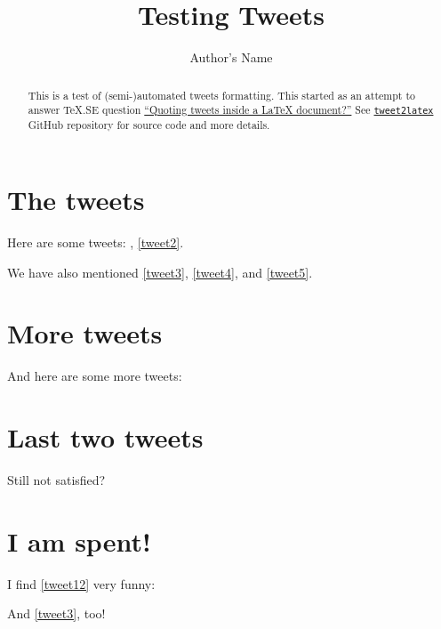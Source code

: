 \documentclass[a4paper,twocolumn]{article}
\newcommand{\inputTweet}[1]{%
  \def\tweetLabel{#1}%
}
\begin{document}
\title{Testing Tweets}
\author{Author's Name}

\maketitle

\begin{abstract}
  This is a test of (semi-)automated tweets formatting. This started as an
  attempt to answer \TeX .SE question
  \href{http://tex.stackexchange.com/q/323562/28495}{``Quoting tweets inside
    a \LaTeX{} document?''} See
  \texttt{\href{https://github.com/wilx/tweet2latex}{tweet2latex}} GitHub
  repository for source code and more details.
\end{abstract}

\section{The tweets}\label{the-tweets}%
Here are some tweets: , \cref{tweet2}.
\inputTweet{tweet1}

\inputTweet{tweet2}

\inputTweet{tweet3}

\inputTweet{tweet4}

\inputTweet{tweet5}

We have also mentioned \cref{tweet3}, \cref{tweet4}, and \cref{tweet5}.

\section{More tweets}\label{more-tweets}%
And here are some more tweets:
\inputTweet{tweet6}

\inputTweet{tweet7}

\inputTweet{tweet8}


\section{Last two tweets}\label{last-two-tweets}%
Still not satisfied?
\inputTweet{tweet10}


\section{I am spent!}\label{i-am-spent}%
I find \cref{tweet12} very funny:
\inputTweet{tweet12}

And \cref{tweet3}, too!


%
\end{document}
